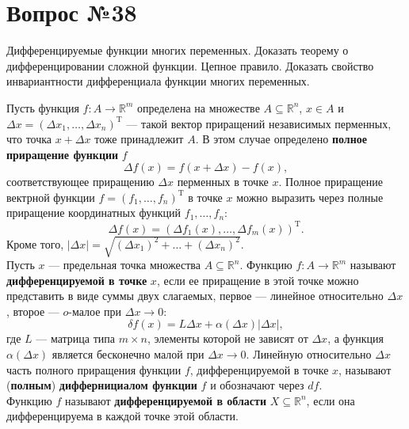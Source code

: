 \documentclass[12pt]{report}
\numberwithin{equation}{section}
\begin{document}
\newpage \section{Вопрос №38} %
\begin{framed}
Дифференцируемые функции многих переменных. Доказать теорему о дифференцировании сложной функции. Цепное правило. Доказать свойство инвариантности дифференциала функции многих переменных.
\end{framed}
Пусть функция $f : A \to \mathbb{R}^m$ определена  на множестве $A \subseteq \mathbb{R}^n$, $x \in A$ и $\Delta x = (\Delta x_1, \ldots, \Delta x_n)^{\mathrm{T}}$ --- такой вектор приращений независимых перменных, что точка $x + \Delta x$ тоже принадлежит $A$. В этом случае определено \textbf{полное приращение функции} $f$
\[ \Delta f(x) = f(x + \Delta x) - f(x),\]
соответствующее приращению $\Delta x$ перменных в точке $x$. Полное приращение вектрной функции $f = (f_1, \ldots, f_n)^{\mathrm{T}}$ в точке $x$ можно выразить через полные приращение координатных функций $f_1, \ldots, f_n$:
\begin{equation*} \Delta f(x) = (\Delta f_1(x), \ldots, \Delta f_m(x))^{\mathrm{T}}. \end{equation*}
Кроме того, $|\Delta x| = \sqrt{(\Delta x_1)^2 + \dots + (\Delta x_n)^2}$.\\


Пусть $x$ --- предельная точка множества $A \subseteq \mathbb{R}^n$. Функцию $f: A \to \mathbb{R}^m$ называют \textbf{дифференцируемой в точке} $x$, если ее приращение в этой точке можно представить в виде суммы двух слагаемых, первое --- линейное относительно $\Delta x$, второе --- $o$-малое при $\Delta x \to 0$:
\begin{equation*}
\delta f(x) = L \Delta x + \alpha(\Delta x)|\Delta x|,
\end{equation*}
где $L$ --- матрица типа $m \times n$, элементы которой не зависят от $\Delta x$, а функция $\alpha(\Delta x)$ является бесконечно малой при $\Delta x \to 0$. Линейную относительно $\Delta x$ часть полного приращения функции $f$, дифференцируемой в точке $x$, называют (\textbf{полным}) \textbf{диффернициалом функции} $f$ и обозначают через $df$.\\

Функцию $f$ называют \textbf{дифференцируемой в области} $X \subseteq \mathbb{R}^n$, если она дифференцируема в каждой точке этой области.\\
\end{document}
